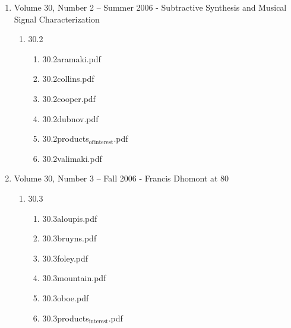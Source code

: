 \documentclass[11pt]{article}
\begin{document}
\begin{enumerate}
\begin{enumerate}
\item Volume 30, Number 2 – Summer 2006 - Subtractive Synthesis and Musical Signal Characterization
\label{sec-1-1-1-1-11-19-19-3}
\begin{enumerate}
\item 30.2
\label{sec-1-1-1-1-11-19-19-3-1}
\begin{enumerate}
\item 30.2aramaki.pdf
\label{sec-1-1-1-1-11-19-19-3-1-1}

\item 30.2collins.pdf
\label{sec-1-1-1-1-11-19-19-3-1-2}

\item 30.2cooper.pdf
\label{sec-1-1-1-1-11-19-19-3-1-3}

\item 30.2dubnov.pdf
\label{sec-1-1-1-1-11-19-19-3-1-4}

\item 30.2products$_{\text{of}}$$_{\text{interest}}$.pdf
\label{sec-1-1-1-1-11-19-19-3-1-5}

\item 30.2valimaki.pdf
\label{sec-1-1-1-1-11-19-19-3-1-6}
\end{enumerate}
\end{enumerate}

\item Volume 30, Number 3 – Fall 2006 - Francis Dhomont at 80
\label{sec-1-1-1-1-11-19-19-4}
\begin{enumerate}
\item 30.3
\label{sec-1-1-1-1-11-19-19-4-1}
\begin{enumerate}
\item 30.3aloupis.pdf
\label{sec-1-1-1-1-11-19-19-4-1-1}

\item 30.3bruyns.pdf
\label{sec-1-1-1-1-11-19-19-4-1-2}

\item 30.3foley.pdf
\label{sec-1-1-1-1-11-19-19-4-1-3}

\item 30.3mountain.pdf
\label{sec-1-1-1-1-11-19-19-4-1-4}

\item 30.3oboe.pdf
\label{sec-1-1-1-1-11-19-19-4-1-5}

\item 30.3products$_{\text{interest}}$.pdf
\label{sec-1-1-1-1-11-19-19-4-1-6}
\end{enumerate}
\end{enumerate}


\end{enumerate}
\end{enumerate}
\end{document}
